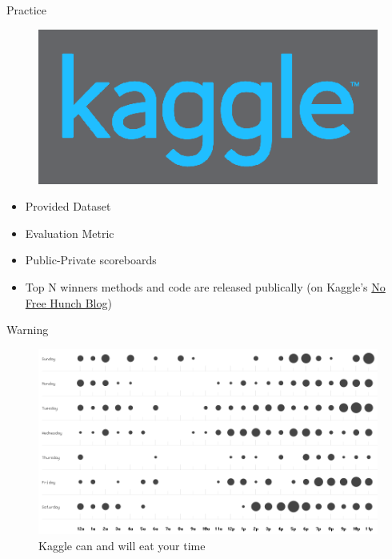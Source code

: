 \documentclass[ignorenonframetext,]{beamer}
\begin{document}
\begin{frame}{Practice}

\begin{figure}[htbp]
\centering
\includegraphics{assets/presentation/GIML/kaggle.png}
\caption{}
\end{figure}

\begin{itemize}
\itemsep1pt\parskip0pt
\item
  Provided Dataset
\item
  Evaluation Metric
\item
  Public-Private scoreboards
\item
  Top N winners methods and code are released publically (on Kaggle's
  \href{http://blog.kaggle.com/}{No Free Hunch Blog})
\end{itemize}

\end{frame}

\begin{frame}{Warning}

\begin{figure}[htbp]
\centering
\includegraphics{assets/presentation/GIML/hspunchcard.png}
\caption{Kaggle can and will eat your time}
\end{figure}

\end{frame}
\end{document}
